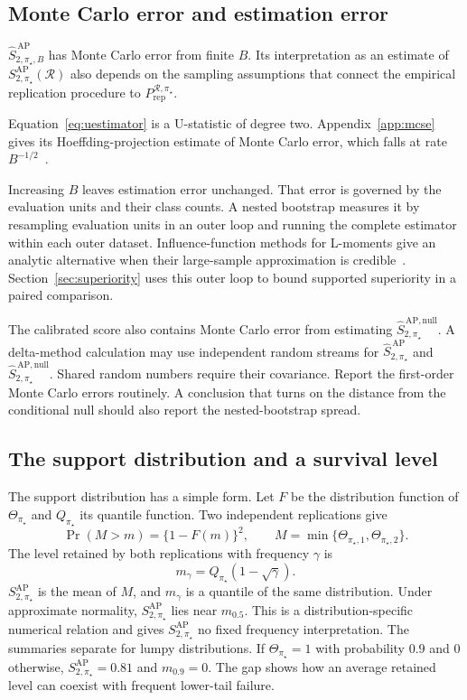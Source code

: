 \documentclass[11pt]{article}
\newcommand{\Regime}{\mathcal{R}}
\newcommand{\SAPfull}{S_{2,\pi_\star}^{\mathrm{AP}}(\Regime)}
\newcommand{\SAP}{S_{2,\pi_\star}^{\mathrm{AP}}}
\newcommand{\SAPHat}{\widehat S_{2,\pi_\star}^{\,\mathrm{AP}}}
\newcommand{\SAPHatB}{\widehat S_{2,\pi_\star,B}^{\,\mathrm{AP}}}
\newcommand{\SAPnullHat}{\widehat S_{2,\pi_\star}^{\,\mathrm{AP,null}}}
\newcommand{\PRep}{P_{\mathrm{rep}}^{\Regime,\pi_\star}}
\theoremstyle{remark}
\begin{document}
\subsection{Monte Carlo error and estimation error}
\label{sec:error}

$\SAPHatB$ has Monte Carlo error from finite $B$. Its interpretation as an estimate of $\SAPfull$ also depends on the sampling assumptions that connect the empirical replication procedure to $\PRep$.

Equation~\eqref{eq:uestimator} is a U-statistic of degree two. Appendix~\ref{app:mcse} gives its Hoeffding-projection estimate of Monte Carlo error, which falls at rate $B^{-1/2}$~\cite{hoeffding1948ustat}.

Increasing $B$ leaves estimation error unchanged. That error is governed by the evaluation units and their class counts. A nested bootstrap measures it by resampling evaluation units in an outer loop and running the complete estimator within each outer dataset. Influence-function methods for L-moments give an analytic alternative when their large-sample approximation is credible~\cite{hosking1990lmoments}. Section~\ref{sec:superiority} uses this outer loop to bound supported superiority in a paired comparison.

The calibrated score also contains Monte Carlo error from estimating $\SAPnullHat$. A delta-method calculation may use independent random streams for $\SAPHat$ and $\SAPnullHat$. Shared random numbers require their covariance. Report the first-order Monte Carlo errors routinely. A conclusion that turns on the distance from the conditional null should also report the nested-bootstrap spread.

\subsection{The support distribution and a survival level}
\label{sec:survival}

The support distribution has a simple form. Let $F$ be the distribution function of $\Theta_{\pi_\star}$ and $Q_{\pi_\star}$ its quantile function. Two independent replications give
\[
\Pr(M>m)=\{1-F(m)\}^2,
\qquad
M=\min\{\Theta_{\pi_\star,1},\Theta_{\pi_\star,2}\}.
\]
The level retained by both replications with frequency $\gamma$ is
\begin{equation}
m_\gamma=Q_{\pi_\star}(1-\sqrt{\gamma}).
\label{eq:survival-level}
\end{equation}
$\SAP$ is the mean of $M$, and $m_\gamma$ is a quantile of the same distribution. Under approximate normality, $\SAP$ lies near $m_{0.5}$. This is a distribution-specific numerical relation and gives $\SAP$ no fixed frequency interpretation. The summaries separate for lumpy distributions. If $\Theta_{\pi_\star}=1$ with probability $0.9$ and $0$ otherwise, $\SAP=0.81$ and $m_{0.9}=0$. The gap shows how an average retained level can coexist with frequent lower-tail failure.
\end{document}
